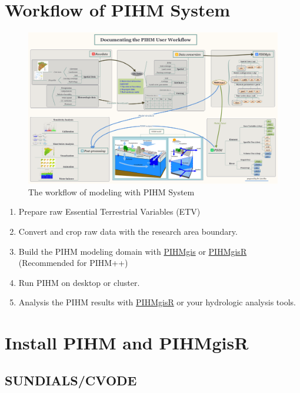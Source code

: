 \documentclass[]{scrbook}
\providecommand{\tightlist}{%
  \setlength{\itemsep}{0pt}\setlength{\parskip}{0pt}}
\begin{document}
\chapter{Workflow of PIHM System}\label{workflow-of-pihm-system}

\begin{figure}
\centering
\includegraphics{./Fig/Workflow.png}
\caption{The workflow of modeling with PIHM System}
\end{figure}

\begin{enumerate}
\def\labelenumi{\arabic{enumi}.}
\tightlist
\item
  Prepare raw Essential Terrestrial Variables (ETV)
\item
  Convert and crop raw data with the research area boundary.
\item
  Build the PIHM modeling domain with
  \href{http://www.pihm.psu.edu/pihmgis_home.html}{PIHMgis} or
  \href{https://github.com/shulele/PIHMgisR}{PIHMgisR} (Recommended for
  PIHM++)
\item
  Run PIHM on desktop or cluster.
\item
  Analysis the PIHM results with
  \href{https://github.com/shulele/PIHMgisR}{PIHMgisR} or your
  hydrologic analysis tools.
\end{enumerate}

\chapter{Install PIHM and PIHMgisR}\label{install-pihm-and-pihmgisr}

\section{SUNDIALS/CVODE}\label{sundialscvode}
\end{document}
